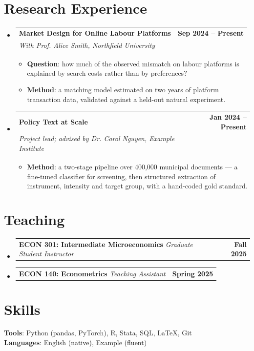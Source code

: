 \documentclass[11pt,a4paper]{article}
\makeatletter
\newcommand{\resumeItem}[1]{
  \item\small{
    {#1 \vspace{-2pt}}
  }
}
\newcommand{\resumeSubheading}[4]{
  \vspace{-2pt}\item
    \begin{tabular*}{0.97\textwidth}[t]{l@{\extracolsep{\fill}}r}
      \textbf{#1} & \textbf{\color{AcademicBlue}#2} \\[-3pt]
      \textit{\small#3} & \textit{\small #4} \\
    \end{tabular*}\vspace{-7pt}
}
\newcommand{\resumeProjectHeading}[2]{
    \vspace{-1pt}\item
    \begin{tabularx}{0.97\textwidth}{@{}>{\raggedright\arraybackslash}X@{\hspace{1.2em}}r@{}}
      \small#1 & \textbf{\color{AcademicBlue}#2} \\
    \end{tabularx}\vspace{-7pt}
}
\newcommand{\resumeSubHeadingListStart}{\begin{itemize}[leftmargin=0.15in, label={}]}
\newcommand{\resumeSubHeadingListEnd}{\end{itemize}}
\newcommand{\resumeItemListStart}{\begin{itemize}[leftmargin=0.15in, label={\tiny\raisebox{0.5ex}{\color{AcademicBlue}$\bullet$}}]}
\newcommand{\resumeItemListEnd}{\end{itemize}\vspace{-5pt}}
\makeatother
\begin{document}
\section{Research Experience}
  \resumeSubHeadingListStart

    \resumeSubheading
      {Market Design for Online Labour Platforms}{Sep 2024 -- Present}
      {\footnotesize\emph{With Prof. Alice Smith, Northfield University}}{}
    \resumeItemListStart
        \resumeItem{\textbf{Question}: how much of the observed mismatch on labour platforms is explained by search costs rather than by preferences?}
        \resumeItem{\textbf{Method}: a matching model estimated on two years of platform transaction data, validated against a held-out natural experiment.}
    \resumeItemListEnd

    \resumeSubheading
      {Policy Text at Scale}{Jan 2024 -- Present}
      {\footnotesize\emph{Project lead; advised by Dr. Carol Nguyen, Example Institute}}{}
    \resumeItemListStart
        \resumeItem{\textbf{Method}: a two-stage pipeline over 400{,}000 municipal documents --- a fine-tuned classifier for screening, then structured extraction of instrument, intensity and target group, with a hand-coded gold standard.}
    \resumeItemListEnd

  \resumeSubHeadingListEnd

\section{Teaching}
  \resumeSubHeadingListStart
    \resumeProjectHeading
      {\textbf{ECON 301: Intermediate Microeconomics} \quad \footnotesize\emph{Graduate Student Instructor}}{Fall 2025}
    \resumeProjectHeading
      {\textbf{ECON 140: Econometrics} \quad \footnotesize\emph{Teaching Assistant}}{Spring 2025}
  \resumeSubHeadingListEnd

\section{Skills}
\vspace{2pt}
\begin{small}
\noindent \textbf{Tools}: Python (pandas, PyTorch), R, Stata, SQL, \LaTeX, Git \\[2pt]
\textbf{Languages}: English (native), Example (fluent)
\end{small}
\end{document}
